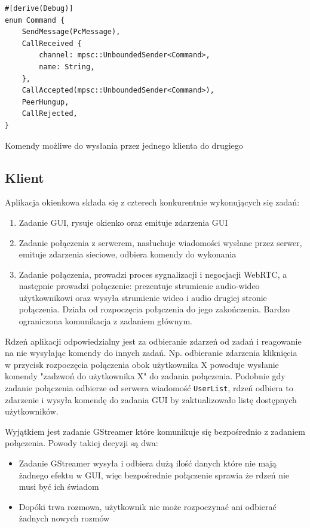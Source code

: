 \begin{listing}[H]
    \begin{verbatim}
#[derive(Debug)]
enum Command {
    SendMessage(PcMessage),
    CallReceived {
        channel: mpsc::UnboundedSender<Command>,
        name: String,
    },
    CallAccepted(mpsc::UnboundedSender<Command>),
    PeerHungup,
    CallRejected,
}
    \end{verbatim}
    \caption{Komendy możliwe do wysłania przez jednego klienta do drugiego}
    \label{lst:server_command}
\end{listing}



\subsection{Klient}

Aplikacja okienkowa składa się z czterech konkurentnie wykonujących się zadań:

\begin{enumerate}
    \item Zadanie GUI, rysuje okienko oraz emituje zdarzenia GUI
    \item Zadanie połączenia z serwerem, nasłuchuje wiadomości wysłane przez serwer, emituje
          zdarzenia sieciowe, odbiera komendy do wykonania
    \item Zadanie połączenia, prowadzi proces sygnalizacji i negocjacji WebRTC, a następnie prowadzi
          połączenie: prezentuje strumienie audio-wideo użytkownikowi oraz wysyła strumienie wideo i
          audio drugiej stronie połączenia. Działa od rozpoczęcia połączenia do jego zakończenia.
          Bardzo ograniczona komunikacja z zadaniem głównym.
\end{enumerate}

Rdzeń aplikacji odpowiedzialny jest za odbieranie zdarzeń od zadań i reagowanie na nie wysyłając
komendy do innych zadań. Np. odbieranie zdarzenia kliknięcia w przycisk rozpoczęcia połączenia
obok użytkownika X powoduje wysłanie komendy "zadzwoń do użytkownika X" do zadania połączenia.
Podobnie gdy zadanie połączenia odbierze od serwera wiadomość \verb|UserList|, rdzeń odbiera to
zdarzenie i wysyła komendę do zadania GUI by zaktualizowało listę dostępnych użytkowników.

Wyjątkiem jest zadanie GStreamer które komunikuje się bezpośrednio z zadaniem połączenia. Powody
takiej decyzji są dwa:

\begin{itemize}
    \item Zadanie GStreamer wysyła i odbiera dużą ilość danych które nie mają żadnego efektu w GUI,
          więc bezpośrednie połączenie sprawia że rdzeń nie musi być ich świadom
    \item Dopóki trwa rozmowa, użytkownik nie może rozpoczynać ani odbierać żadnych nowych rozmów
\end{itemize}

